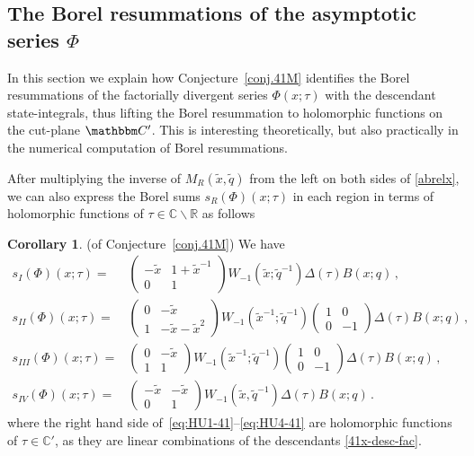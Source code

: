 \documentclass[12pt,reqno]{amsart}
\theoremstyle{definition}
\newtheorem{corollary}[theorem]{Corollary}
\def\BC{\mathbbm C}
\def\tq{\tilde{q}}
\def\tx{\tilde{x}}
\def\tx{\tilde{x}}
\def\IC{\mathbb{C}}
\def\IR{\mathbb{R}}
\begin{document}
\subsection{The Borel resummations of the asymptotic series $\Phi$}
\label{sub.borel41}

In this section we explain how Conjecture~\ref{conj.41M} identifies the
Borel resummations of the factorially divergent series $\Phi(x;\tau)$
with the descendant state-integrals, thus lifting the Borel resummation
to holomorphic functions on the cut-plane $\BC'$. This is
interesting theoretically, but also practically in the numerical
computation of Borel resummations.

After multiplying the inverse of $M_R(\tx,\tq)$ from the left
on both sides of \eqref{abrelx}, we can also express the Borel sums
$s_R(\Phi)(x;\tau)$ in each region in terms of holomorphic functions
of $\tau \in \IC\backslash \IR$ as follows

\begin{corollary}(of Conjecture~\ref{conj.41M})
  \label{cor.41borel}
  We have
\begin{subequations}
\begin{align}
  s_{I}(\Phi)(x;\tau) =
  &\begin{pmatrix}
    -\tx&1+\tx^{-1}\\0&1
  \end{pmatrix} W_{-1}(\tx;\tq^{-1})\Delta(\tau)B(x;q)\,,
                        \label{eq:HU1-41}\\
  s_{II}(\Phi)(x;\tau) =
  &\begin{pmatrix}
    0&-\tx\\1&-\tx-\tx^2
  \end{pmatrix} W_{-1}(\tx^{-1};\tq^{-1})
               \begin{pmatrix}
                 1&0\\0&-1
               \end{pmatrix}\Delta(\tau) B(x;q)\,,
                         \label{eq:HU2-41}\\
  s_{III}(\Phi)(x;\tau) =
  &\begin{pmatrix}
    0&-\tx\\1&1   
  \end{pmatrix} W_{-1}(\tx^{-1};\tq^{-1})
               \begin{pmatrix}
                 1&0\\0&-1
               \end{pmatrix}\Delta(\tau) B(x;q)\,,
                         \label{eq:HU3-41}\\
  s_{IV}(\Phi)(x;\tau)=
  &\begin{pmatrix}
    -\tx&-\tx\\0&1   
  \end{pmatrix}W_{-1}(\tx,\tq^{-1})\Delta(\tau) B(x;q)\,.
                  \label{eq:HU4-41}
\end{align}
\end{subequations}
where the right hand side of~\eqref{eq:HU1-41}--\eqref{eq:HU4-41} are
holomorphic functions of $\tau \in \IC'$, as they are linear
combinations of the descendants \eqref{41x-desc-fac}.
\end{corollary}
\end{document}
